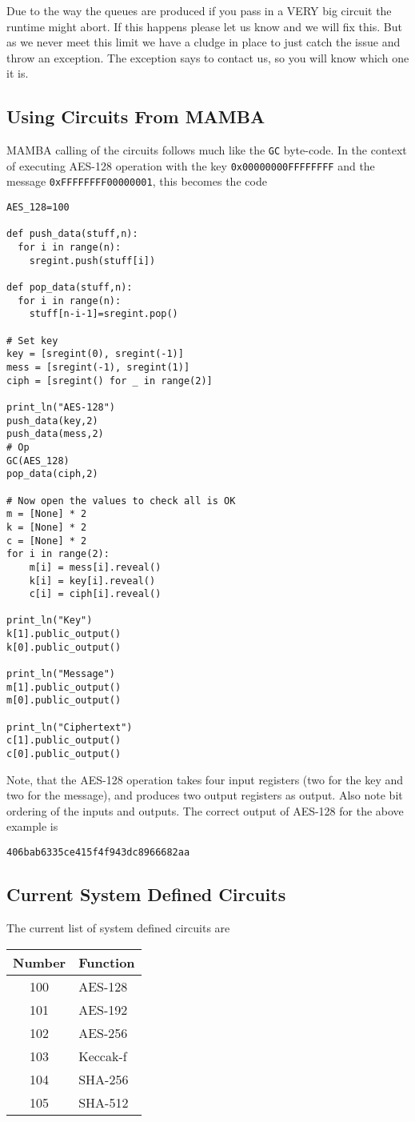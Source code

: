 Due to the way the queues are produced if you pass in a
VERY big circuit the  runtime might abort. If this happens
please let us know and we will fix this. But as we never
meet this limit we have a cludge in place to just catch
the issue and throw an exception. The exception says
to contact us, so you will know which one it is.

\subsection{Using Circuits From MAMBA}
MAMBA calling of the circuits follows much like the
\verb|GC| byte-code.
In the context of executing AES-128 operation with
the key \verb+0x00000000FFFFFFFF+ and the message
\verb+0xFFFFFFFF00000001+, this becomes the code
\begin{lstlisting}
AES_128=100

def push_data(stuff,n):
  for i in range(n):
    sregint.push(stuff[i])

def pop_data(stuff,n):
  for i in range(n):
    stuff[n-i-1]=sregint.pop()

# Set key
key = [sregint(0), sregint(-1)]
mess = [sregint(-1), sregint(1)]
ciph = [sregint() for _ in range(2)]

print_ln("AES-128")
push_data(key,2)
push_data(mess,2)
# Op
GC(AES_128)
pop_data(ciph,2)

# Now open the values to check all is OK
m = [None] * 2
k = [None] * 2
c = [None] * 2
for i in range(2):
	m[i] = mess[i].reveal()
	k[i] = key[i].reveal()
	c[i] = ciph[i].reveal()

print_ln("Key")
k[1].public_output()     
k[0].public_output()

print_ln("Message")
m[1].public_output()     
m[0].public_output()

print_ln("Ciphertext")
c[1].public_output()     
c[0].public_output()
\end{lstlisting}

Note, that the AES-128 operation takes four
input registers (two for the key and two for
the message), and produces two output registers
as output.
Also note bit ordering of the inputs and outputs.
The correct output of AES-128 for the above
example is
\begin{center}
  \verb|406bab6335ce415f4f943dc8966682aa|
\end{center}


\subsection{Current System Defined Circuits}
The current list of system defined circuits are
\begin{center}
\begin{tabular}{c|l}
Number & Function \\
\hline
100 & AES-128 \\
101 & AES-192 \\
102 & AES-256 \\
103 & Keccak-f \\
104 & SHA-256 \\
105 & SHA-512 \\
\end{tabular}
\end{center}

